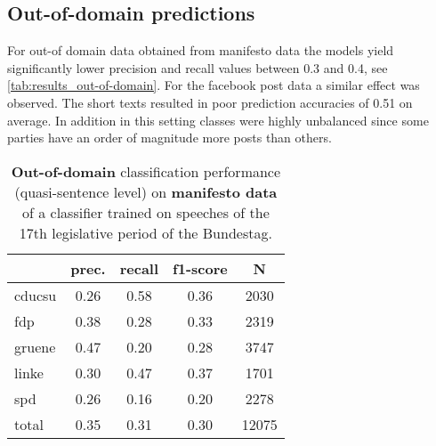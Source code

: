 \documentclass[11pt]{article}
\begin{document}
\subsection{Out-of-domain predictions}
For out-of domain data obtained from manifesto data the models yield significantly lower precision and recall values between 0.3 and 0.4, see \autoref{tab:results_out-of-domain}. For the facebook post data a similar effect was observed. The short texts resulted in poor prediction accuracies of 0.51 on average. In addition in this setting classes were highly unbalanced since some parties have an order of magnitude more posts than others.


\begin{table}[t]
\caption{
\label{tab:results_out-of-domain}
{\bf Out-of-domain} classification performance (quasi-sentence level) on {\bf manifesto data} of a classifier trained on speeches of the 17th legislative period of the Bundestag.
}

\begin{center}
\begin{tabular}{lcccc}
    &         prec.    &recall &  f1-score  & N  \\
\hline \hline
    cducsu    &   0.26   &   0.58   &   0.36    &   2030 \\
    fdp    &   0.38   &   0.28   &   0.33    &   2319 \\
     gruene   &    0.47    &  0.20   &   0.28    &  3747\\
      linke     &  0.30  &    0.47    &  0.37    &   1701\\
        spd     &  0.26  &    0.16   &   0.20    &   2278\\
\hline
total    &   0.35  &    0.31  &    0.30   &   12075\\
%
\end{tabular}
\end{center}

\end{table}
\end{document}
